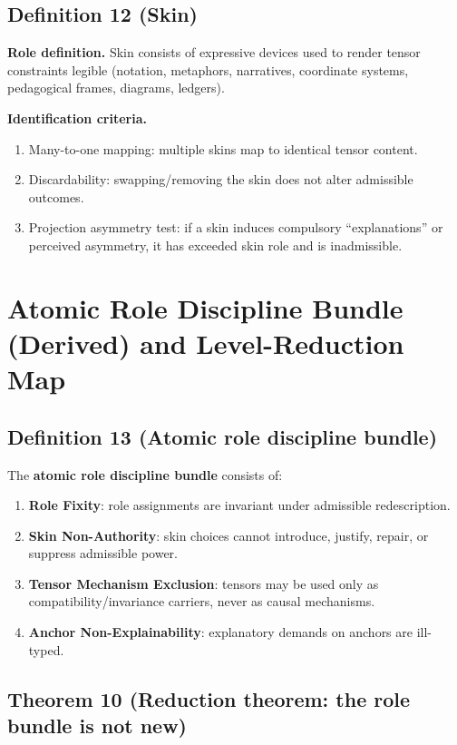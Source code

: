 \documentclass[12pt]{article}
\theoremstyle{plain}
\begin{document}
\subsection{Definition 12 (Skin)}

\textbf{Role definition.} Skin consists of expressive devices used to render tensor constraints legible (notation, metaphors, narratives, coordinate systems, pedagogical frames, diagrams, ledgers).

\textbf{Identification criteria.}
\begin{enumerate}[leftmargin=*]
\item Many-to-one mapping: multiple skins map to identical tensor content.
\item Discardability: swapping/removing the skin does not alter admissible outcomes.
\item Projection asymmetry test: if a skin induces compulsory ``explanations'' or perceived asymmetry, it has exceeded skin role and is inadmissible.
\end{enumerate}

\section{Atomic Role Discipline Bundle (Derived) and Level-Reduction Map}

\subsection{Definition 13 (Atomic role discipline bundle)}

The \textbf{atomic role discipline bundle} consists of:

\begin{enumerate}[leftmargin=*]
\item \textbf{Role Fixity}: role assignments are invariant under admissible redescription.
\item \textbf{Skin Non-Authority}: skin choices cannot introduce, justify, repair, or suppress admissible power.
\item \textbf{Tensor Mechanism Exclusion}: tensors may be used only as compatibility/invariance carriers, never as causal mechanisms.
\item \textbf{Anchor Non-Explainability}: explanatory demands on anchors are ill-typed.
\end{enumerate}

\subsection{Theorem 10 (Reduction theorem: the role bundle is not new)}
\end{document}
